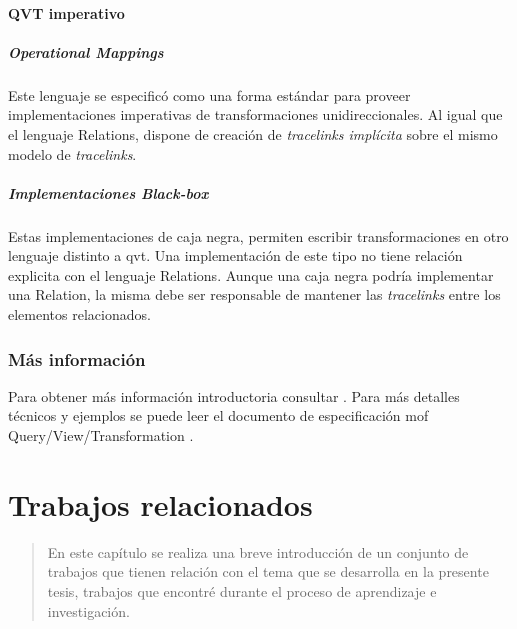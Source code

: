 \documentclass[a4paper,12pt,oneside,spanish]{book}
\begin{document}
\subsubsection{QVT imperativo}


\paragraph{Operational Mappings}

Este lenguaje se especificó como una forma estándar para proveer implementaciones imperativas de transformaciones unidireccionales. Al igual que el lenguaje \textsf{Relations}, dispone de creación de \textit{tracelinks implícita} sobre el mismo modelo de \textit{tracelinks}.


\paragraph{Implementaciones Black-box}

Estas implementaciones de caja negra, permiten escribir transformaciones en otro lenguaje distinto a \gls{qvt}. Una implementación de este tipo no tiene relación explicita con el lenguaje \textsf{Relations}. Aunque una caja negra podría implementar una \textsf{Relation}, la misma debe ser responsable de mantener las \textit{tracelinks} entre los elementos relacionados.


\subsection{Más información}

Para obtener más información introductoria consultar \cite{DSDPM}. Para más detalles técnicos y ejemplos se puede leer el documento de especificación \gls{mof} Query/View/Transformation \cite{QVT}.




\chapter{Trabajos relacionados}

\begin{quotation}
En este capítulo se realiza una breve introducción de un conjunto de trabajos que tienen relación con el tema que se desarrolla en la presente tesis, trabajos que encontré durante el proceso de aprendizaje e investigación.
\end{quotation}
\end{document}
